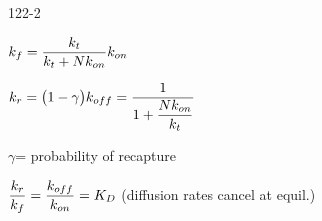 \begin{mitframe}{122-2}
\begin{listone}
	\item $\thermcond_{\fug}=\dfrac{\thermcond_{\timet}}{\thermcond_{\timet}+\nummoles\thermcond_{on}}\thermcond_{on}$
    \item $\thermcond_{\pos}=\big(1-\gamma\big)\thermcond_{off}=\dfrac{1}{1+\dfrac{\nummoles\thermcond_{on}}{\thermcond_{\timet}}}$
    \begin{listtwo}
    	\item $\gamma$= probability of recapture
     \end{listtwo}
	\item $\dfrac{\thermcond_{\pos}}{\thermcond_{\fug}}=\dfrac{\thermcond_{off}}{\thermcond_{on}}=\dilfac_{\elecdisplace}$ (diffusion rates cancel at equil.)
\end{listone}        
\end{mitframe}